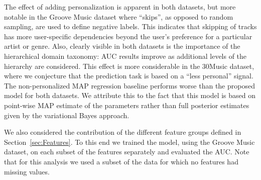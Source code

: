 The effect of adding personalization is apparent in both datasets, but more notable in the Groove Music dataset where ``skips'', as opposed to random sampling, are used to define negative labels. This indicates that skipping of tracks has more user-specific dependencies beyond the user's preference for a particular artist or genre.
Also, clearly visible in both datasets is the importance of the hierarchical domain taxonomy: AUC results improve as additional levels of the hierarchy are considered. This effect is more considerable in the 30Music dataset, where we conjecture that the prediction task is based on a ``less personal'' signal. The non-personalized MAP regression baseline performs worse than the proposed model for both datasets. We attribute this to the fact that this model is based on point-wise MAP estimate of the parameters rather than full posterior estimates given by the variational Bayes approach.


%

%


%




We also considered the contribution of the different feature groups defined in Section~\ref{sec:Features}. To this end we trained the model, using the Groove Music dataset, on each subset of the features separately and evaluated the AUC. Note that for this analysis we used a subset of the data for which no features had missing values. 

